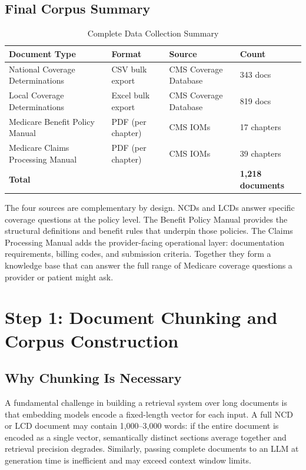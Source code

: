\documentclass[10pt, letterpaper]{article}
\begin{document}
\subsection{Final Corpus Summary}
 
\begin{table}[h]
\centering
\caption{Complete Data Collection Summary}
\label{tab:datasources}
\begin{tabular}{@{}llll@{}}
\toprule
\textbf{Document Type} & \textbf{Format} & \textbf{Source} & \textbf{Count} \\
\midrule
National Coverage Determinations  & CSV bulk export  & CMS Coverage Database & 343 docs \\
Local Coverage Determinations     & Excel bulk export & CMS Coverage Database & 819 docs \\
Medicare Benefit Policy Manual    & PDF (per chapter) & CMS IOMs & 17 chapters \\
Medicare Claims Processing Manual & PDF (per chapter) & CMS IOMs & 39 chapters \\
\midrule
\textbf{Total} & & & \textbf{1,218 documents} \\
\bottomrule
\end{tabular}
\end{table}
 
\noindent The four sources are complementary by design. NCDs and LCDs answer specific
coverage questions at the policy level. The Benefit Policy Manual provides the structural
definitions and benefit rules that underpin those policies. The Claims Processing Manual
adds the provider-facing operational layer: documentation requirements, billing codes,
and submission criteria. Together they form a knowledge base that can answer the full
range of Medicare coverage questions a provider or patient might ask.
 
\section{Step 1: Document Chunking and Corpus Construction}
\label{sec:chunking}
 
\subsection{Why Chunking Is Necessary}
 
A fundamental challenge in building a retrieval system over long documents is that
embedding models encode a fixed-length vector for each input. A full NCD or LCD
document may contain 1,000--3,000 words: if the entire document is encoded as a
single vector, semantically distinct sections average together and retrieval precision
degrades. Similarly, passing complete documents to an LLM at generation time is
inefficient and may exceed context window limits.
 
\end{document}
